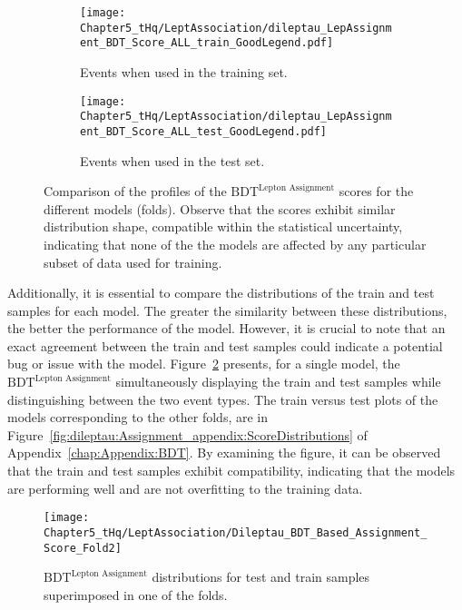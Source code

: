  
 \begin{figure}[h]
	\begin{subfigure}[h]{0.495\linewidth}
		\texttt{[image: Chapter5\_tHq/LeptAssociation/dileptau\_LepAssignment\_BDT\_Score\_ALL\_train\_GoodLegend.pdf]}
		\caption{Events when used in the training set.}
	\end{subfigure}
	\hfill
	\begin{subfigure}[h]{0.505\linewidth}
		\texttt{[image: Chapter5\_tHq/LeptAssociation/dileptau\_LepAssignment\_BDT\_Score\_ALL\_test\_GoodLegend.pdf]}
		\caption{Events when used in the test set.}
	\end{subfigure}%
	\caption{Comparison of the profiles of the  $\text{BDT}^{\text{Lepton Assignment}}$ scores for the different models (folds). 
	Observe that the scores exhibit similar distribution shape, compatible within the statistical uncertainty, 
	indicating that none of the the models are affected by any particular subset of data used for training.}
	\label{fig:ChaptH:dileptau:Assignment:ScoreDistributions}
\end{figure}



Additionally, it is essential to compare the distributions of the train and test 
samples for each model. The greater the similarity between these distributions, 
the better the performance of the model. However, it is crucial to note that an exact 
agreement between the train and test samples could indicate a potential bug or 
issue with the model.
Figure~\ref{fig:dileptau:Assignment_appendix:ScoreDistributions:Example}
presents, for a single model, the $\text{BDT}^{\text{Lepton Assignment}}$ simultaneously displaying 
the train and test samples while distinguishing between the two event types.
The train versus test plots of the models corresponding to the other folds, 
are in Figure~\ref{fig:dileptau:Assignment_appendix:ScoreDistributions}
of Appendix~\ref{chap:Appendix:BDT}.
By examining the figure, it can be 
observed that the train and test samples exhibit compatibility, indicating that the 
models are performing well and are not overfitting to the training data.


\begin{figure}[h]
\centering
\texttt{[image: Chapter5\_tHq/LeptAssociation/Dileptau\_BDT\_Based\_Assignment\_Score\_Fold2]}
\caption{$\text{BDT}^{\text{Lepton Assignment}}$ distributions for test and train samples superimposed in one of the folds.}
\label{fig:dileptau:Assignment_appendix:ScoreDistributions:Example}
\end{figure}


